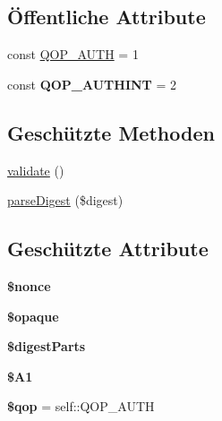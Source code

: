 \subsection*{Öffentliche Attribute}
\begin{DoxyCompactItemize}
\item 
const \mbox{\hyperlink{class_sabre_1_1_h_t_t_p_1_1_auth_1_1_digest_afa5c1b1dc098039d2a3b4f9fcd655ce8}{Q\+O\+P\+\_\+\+A\+U\+TH}} = 1
\item 
\mbox{\label{class_sabre_1_1_h_t_t_p_1_1_auth_1_1_digest_aced4679aaa583cf7e685b1cad2da26c1}} 
const {\bfseries Q\+O\+P\+\_\+\+A\+U\+T\+H\+I\+NT} = 2
\end{DoxyCompactItemize}
\subsection*{Geschützte Methoden}
\begin{DoxyCompactItemize}
\item 
\mbox{\hyperlink{class_sabre_1_1_h_t_t_p_1_1_auth_1_1_digest_a178ae979d08871d75cd67b6ad92135c1}{validate}} ()
\item 
\mbox{\hyperlink{class_sabre_1_1_h_t_t_p_1_1_auth_1_1_digest_a030fa596c49a9aa42e59c745ab88b91b}{parse\+Digest}} (\$digest)
\end{DoxyCompactItemize}
\subsection*{Geschützte Attribute}
\begin{DoxyCompactItemize}
\item 
\mbox{\label{class_sabre_1_1_h_t_t_p_1_1_auth_1_1_digest_a69c56eb299b0f415a6c65d2e7ba1db67}} 
{\bfseries \$nonce}
\item 
\mbox{\label{class_sabre_1_1_h_t_t_p_1_1_auth_1_1_digest_addabac9e9c890d19a8f5ec10b8a589db}} 
{\bfseries \$opaque}
\item 
\mbox{\label{class_sabre_1_1_h_t_t_p_1_1_auth_1_1_digest_ae3f597c2bf45b70b053d53b7b4ec0232}} 
{\bfseries \$digest\+Parts}
\item 
\mbox{\label{class_sabre_1_1_h_t_t_p_1_1_auth_1_1_digest_ae6fb0e670ea7eb070ba1a020c135202b}} 
{\bfseries \$\+A1}
\item 
\mbox{\label{class_sabre_1_1_h_t_t_p_1_1_auth_1_1_digest_a43aa43bba4178bffd75149796c6c249a}} 
{\bfseries \$qop} = self\+::\+Q\+O\+P\+\_\+\+A\+U\+TH
\end{DoxyCompactItemize}


